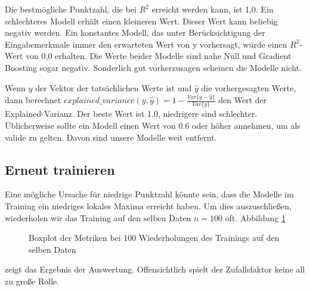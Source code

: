 \documentclass[a4paper,10pt]{scrartcl}
\begin{document}
Die bestmögliche Punktzahl, die bei $R^2$ erreicht werden kann, ist 1,0. Ein schlechteres Modell erhält einen kleineren Wert. Dieser Wert kann beliebig negativ werden. Ein konstantes Modell, das unter Berücksichtigung der Eingabemerkmale immer den erwarteten Wert von y vorhersagt, würde einen $R^2$-Wert von 0,0 erhalten. Die Werte beider Modelle sind nahe Null und Gradient Boosting sogar negativ. Sonderlich gut vorherzusagen scheinen die Modelle nicht.

Wenn $y$ der Vektor der tatsächlichen Werte ist und $\hat{y}$ die vorhergesagten Werte, dann berechnet $explained\_{}variance(y, \hat{y}) = 1 - \frac{Var\{ y - \hat{y}\}}{Var\{y\}}$ den Wert der Explained-Varianz. Der beste Wert ist 1.0, niedrigere sind schlechter. Üblicherweise sollte ein Modell einen Wert von 0.6 oder höher annehmen, um als valide zu gelten. Davon sind unsere Modelle weit entfernt.

\subsection{Erneut trainieren}
Eine mögliche Ursache für niedrige Punktzahl könnte sein, dass die Modelle im Training ein niedriges lokales Maxima erreicht haben. Um dies auszuschließen, wiederholen wir das Training auf den selben Daten $n=100$ oft. Abbildung \ref{fig:localminimum}\begin{figure}
	\centering
	\caption{Boxplot der Metriken bei 100 Wiederholungen des Trainings auf den selben Daten}
	\label{fig:localminimum}
\end{figure} 
zeigt das Ergebnis der Auswertung. Offensichtlich spielt der Zufallsfaktor keine all zu große Rolle.
\end{document}
